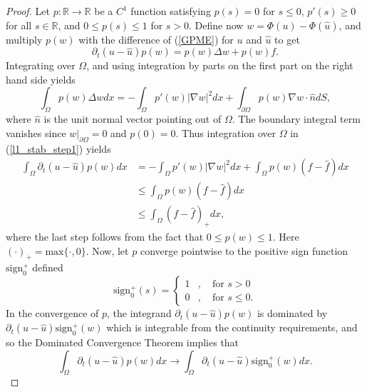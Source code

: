 \documentclass[11pt, a4paper]{article}
\begin{document}
\begin{proof}
Let $p: \mathbb{R} \to \mathbb{R}$ be a $C^1$ function satisfying $p(s) = 0$ for $s \leq 0$, $p'(s) \geq 0$ for all $s\in \mathbb{R}$, and $0 \leq p(s) \leq 1$ for $s > 0$. Define now $w = \Phi(u) - \Phi(\hat{u})$, and multiply $p(w)$ with the difference of (\ref{GPME}) for $u$ and $\hat{u}$ to get
\begin{equation}
\label{l1_stab_step1}
\partial_t(u-\hat{u})p(w) = p(w)\Delta w + p(w)f.
\end{equation}
Integrating over $\Omega$, and using integration by parts on the first part on the right hand side yields
\begin{equation*}
\int_\Omega p(w)\Delta w dx = -\int_\Omega p'(w)|\nabla w|^2dx + \int_{\partial \Omega}p(w)\nabla w \cdot \hat{n} dS,
\end{equation*}
where $\hat{n}$ is the unit normal vector pointing out of $\Omega$. The boundary integral term vanishes since $w\big|_{\partial \Omega} = 0$ and $p(0)=0$. Thus integration over $\Omega$ in (\ref{l1_stab_step1}) yields 
\begin{align*}
\int_{\Omega}\partial_t(u-\hat{u})p(w)dx &= -\int_{\Omega}p'(w)|\nabla w|^2dx + \int_{\Omega}p(w)(f-\hat{f}) dx \\
	&\leq \int_{\Omega}p(w)(f-\hat{f}) dx \\
	&\leq \int_{\Omega}(f-\hat{f})_+ dx,
\end{align*}
where the last step follows from the fact that $0 \leq p(w) \leq 1$. Here $(\cdot)_+ = \mathrm{max}\{\cdot, 0\}$.
Now, let $p$ converge pointwise to the positive sign function $\mathrm{sign}_0^+$ defined
\begin{equation*}
\mathrm{sign}^+_0(s) = \begin{cases}
1&, \quad \text{for } s>0 \\
0&, \quad \text{for } s\leq 0.
\end{cases}
\end{equation*}
In the convergence of $p$, the integrand $\partial_t(u-\hat{u})p(w)$ is dominated by $\partial_t (u - \hat{u}) \mathrm{sign}_0^+(w)$ which is integrable from the continuity requirements, and so the Dominated Convergence Theorem implies that
\begin{equation*}
\int_\Omega \partial_t(u-\hat{u})p(w) dx \to \int_\Omega \partial_t (u - \hat{u}) \mathrm{sign}_0^+(w)dx.
\end{equation*}


\end{proof}
\end{document}
